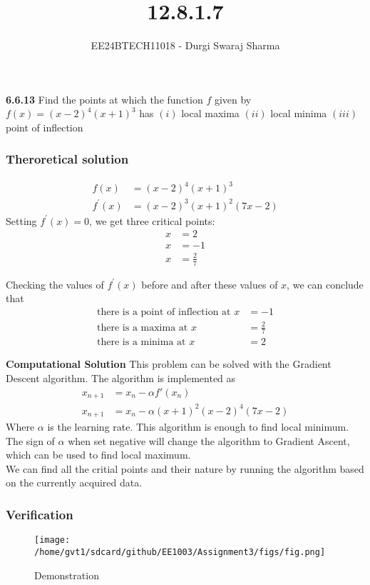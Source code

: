 \documentclass{beamer}
\title{12.8.1.7}
\author{EE24BTECH11018 - Durgi Swaraj Sharma}
\date{}
\providecommand{\brak}[1]{\ensuremath{\left(#1\right)}}
\theoremstyle{remark}
\numberwithin{equation}{section}
\begin{document}
		\frame{\titlepage}
		\begin{frame}
\textbf{6.6.13} Find the points at which the function $f$ given by $f\brak{x} = \brak{x-2}^4 \brak{x+1}^3$ has \brak{i} local maxima \brak{ii} local minima \brak{iii} point of inflection
		\end{frame}
		\begin{frame}
			\frametitle{\textbf{Theroretical solution}}
\begin{align}
	f\brak{x} &= \brak{x-2}^4\brak{x+1}^3\\
	f^{\prime}\brak{x} &= \brak{x-2}^3\brak{x+1}^2\brak{7x-2}
\end{align}
Setting $f^{\prime}\brak{x} = 0$, we get three critical points:
\begin{align}
	x &= 2\\ x &= -1\\ x &= \frac{2}{7}
\end{align}
		\end{frame}
		\begin{frame}
Checking the values of $f^{\prime}\brak{x}$ before and after these values of $x$, we can conclude that
\begin{align*}
	\text{there is a point of inflection at } x&=-1\\
	\text{there is a maxima at } x&=\frac{2}{7}\\
	\text{there is a minima at } x&=2
\end{align*}
		\end{frame}
		\begin{frame}
\textbf{Computational Solution}
This problem can be solved with the Gradient Descent algorithm.
The algorithm is implemented as
\begin{align}
	x_{n+1}&=x_n-\alpha f{\prime}\brak{x_n}\\
	x_{n+1}&=x_n-\alpha \brak{x+1}^2\brak{x-2}^4\brak{7x-2}
\end{align}
Where $\alpha$ is the learning rate. This algorithm is enough to find local minimum. The sign of $\alpha$ when set negative will change the algorithm to Gradient Ascent, which can be used to find local maximum.\\
We can find all the critial points and their nature by running the algorithm based on the currently acquired data.
		\end{frame}
		\begin{frame}
			\frametitle{Verification}
\begin{figure}
	\centering
	\texttt{[image: /home/gvt1/sdcard/github/EE1003/Assignment3/figs/fig.png]}
	\caption{Demonstration}
\end{figure}
		\end{frame}
\end{document}

